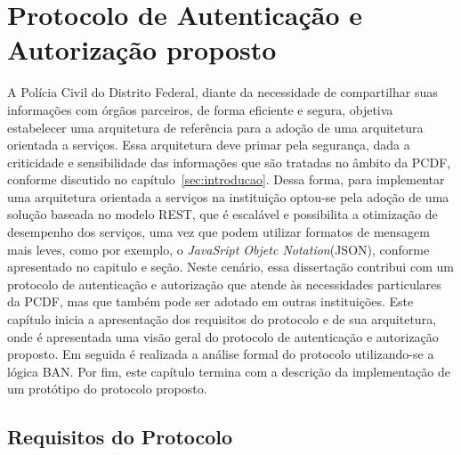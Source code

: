 \chapter{Protocolo de Autenticação e Autorização proposto}\label{cap:Protocolo}



A Polícia Civil do Distrito Federal, diante da necessidade de compartilhar suas informações com órgãos parceiros, de forma eficiente e segura, objetiva estabelecer uma arquitetura de referência para a adoção de uma arquitetura orientada a serviços. Essa arquitetura deve primar pela segurança, dada a criticidade e sensibilidade das informações que são tratadas no âmbito da PCDF, conforme discutido no capítulo~\ref{sec:introducao}.
Dessa forma, para implementar uma arquitetura orientada a serviços na instituição optou-se pela adoção de uma solução baseada no modelo REST, que é escalável e possibilita a otimização de desempenho dos serviços, uma vez que podem utilizar formatos de mensagem mais leves, como por exemplo, o \emph{JavaSript Objetc Notation}(JSON), conforme apresentado no capitulo e seção. Neste cenário, essa dissertação contribui com um protocolo de autenticação e autorização que atende às necessidades particulares da PCDF, mas que também pode ser adotado em outras instituições. Este capítulo inicia a apresentação dos requisitos do protocolo e de sua arquitetura, onde é apresentada uma visão geral do protocolo de autenticação e autorização proposto. Em seguida é realizada a análise formal do protocolo utilizando-se a lógica BAN. Por fim, este capítulo termina com a descrição da implementação de um protótipo do protocolo proposto.


\section{Requisitos do Protocolo}\label{sec:reqprotocolo}

